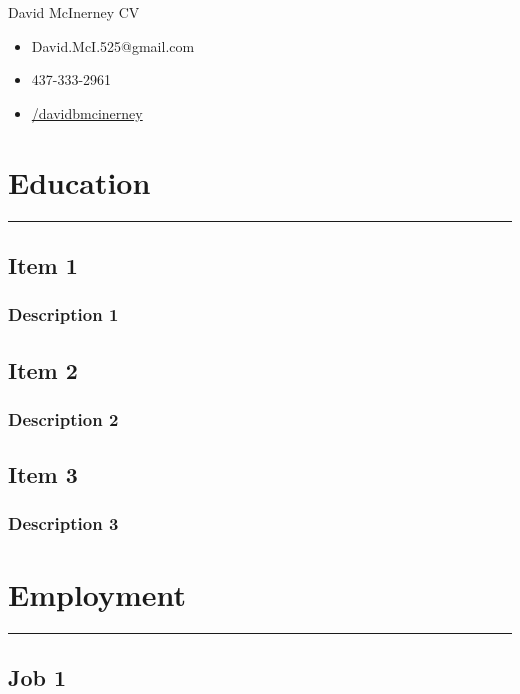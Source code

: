 \documentclass[11pt]{article}
\begin{document}
		\def\arraystretch{1.3}	 %
			\begin{minipage}[b]{0.6\textwidth}
				\begin{flushleft}
					{\noindent \Huge David McInerney CV}
				\end{flushleft}	 
			\end{minipage}
			\begin{minipage}[b]{0.32\textwidth}
			\begin{itemize}
				\item David.McI.525@gmail.com
				\item 437-333-2961
				\item \href{http://www.linkedin.com/in/davidbmcinerney}{/davidbmcinerney}
			\end{itemize}
		\end{minipage}
		
        \section{Education}
		\hrule \hfill
			\subsection{Item 1}
				\subsubsection{Description 1}
			\subsection{Item 2}
				\subsubsection{Description 2}
			\subsection{Item 3}
				\subsubsection{Description 3}
        \section{Employment}
		\hrule \hfill
			\subsection{Job 1}
\end{document}
